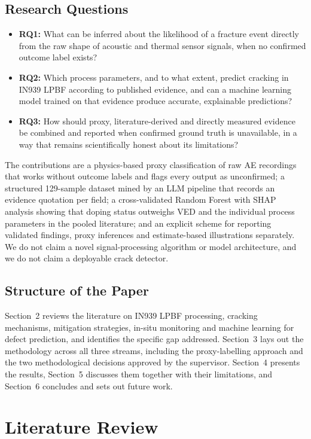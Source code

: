 \documentclass[a4paper]{article}
\begin{document}
\subsection{Research Questions}
\begin{itemize}
  \item \textbf{RQ1:} What can be inferred about the likelihood of a fracture event directly from the raw shape of acoustic and thermal sensor signals, when no confirmed outcome label exists?
  \item \textbf{RQ2:} Which process parameters, and to what extent, predict cracking in IN939 LPBF according to published evidence, and can a machine learning model trained on that evidence produce accurate, explainable predictions?
  \item \textbf{RQ3:} How should proxy, literature-derived and directly measured evidence be combined and reported when confirmed ground truth is unavailable, in a way that remains scientifically honest about its limitations?
\end{itemize}
The contributions are a physics-based proxy classification of raw AE recordings that works without outcome labels and flags every output as unconfirmed; a structured 129-sample dataset mined by an LLM pipeline that records an evidence quotation per field; a cross-validated Random Forest with SHAP analysis showing that doping status outweighs VED and the individual process parameters in the pooled literature; and an explicit scheme for reporting validated findings, proxy inferences and estimate-based illustrations separately. We do not claim a novel signal-processing algorithm or model architecture, and we do not claim a deployable crack detector.

\subsection{Structure of the Paper}
Section~2 reviews the literature on IN939 LPBF processing, cracking mechanisms, mitigation strategies, in-situ monitoring and machine learning for defect prediction, and identifies the specific gap addressed. Section~3 lays out the methodology across all three streams, including the proxy-labelling approach and the two methodological decisions approved by the supervisor. Section~4 presents the results, Section~5 discusses them together with their limitations, and Section~6 concludes and sets out future work.

\section{Literature Review}
\end{document}
